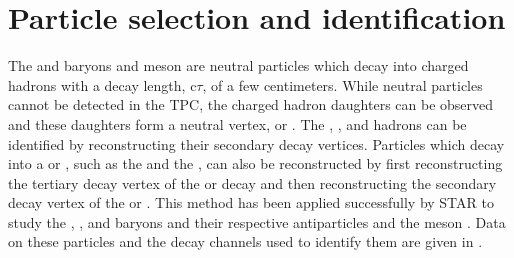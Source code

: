 
\chapter{Particle selection and identification\label{PartID}}


The \lam and \alam baryons and \kaon meson are neutral particles which decay into charged hadrons with a decay length, c$\tau$, of a few centimeters.  While neutral particles cannot be detected in the TPC, the charged hadron daughters can be observed and these daughters form a neutral vertex, or \vzero.  The \lam, \alam, and \kaon hadrons can be identified by reconstructing their secondary decay vertices.  Particles which decay into a \lam or \alam, such as the \myxi and the \myomega, can also be reconstructed by first reconstructing the tertiary decay vertex of the \lam or \alam decay and then reconstructing the secondary decay vertex of the \myxi or \myomega.  This method has been applied successfully by STAR to study the \lam, \myxi, and \myomega baryons and their respective antiparticles and the \kaon meson \cite{STARForwardLambdas,STARStrangenessEnhancement,STARAuAuV0Flow,STARKaonHBT,STARStrangePP200,STARHyperonScaling,STARProtonLambdaCorrelations,STARMultistrangeFlowAuAu200,STARMultistrangeBaryonAuAu130,STARParticleDependentV2AuAu200,STARKaonProductionAuAu130,STARV0AuAu130,STARLambdaAuAu130}.  Data on these particles and the decay channels used to identify them are given in .

